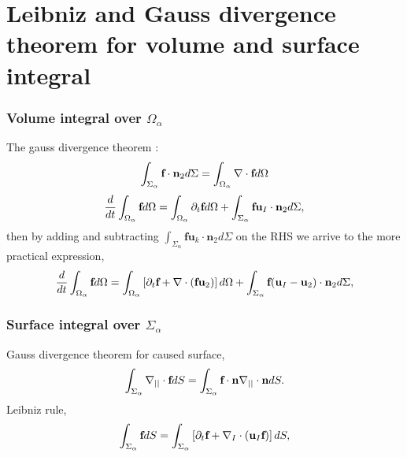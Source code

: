 \section{Leibniz and Gauss divergence theorem for volume and surface integral}
\subsubsection*{Volume integral over $\Omega_\alpha$}
The gauss divergence theorem : 
\begin{equation}
    \int_{\Sigma_\alpha} \textbf{f} \cdot \textbf{n}_2 d\Sigma
    = \int_{\Omega_\alpha} \mathbf{\nabla} \cdot \textbf{f}d\Omega
\end{equation}
\begin{equation}
    \frac{d}{d t} \int_{\Omega_\alpha} \textbf{f} d\Omega
    = \int_{\Omega_\alpha}\partial_t \textbf{f}  d\Omega
    + \int_{\Sigma_\alpha} \textbf{f} \textbf{u}_I \cdot \textbf{n}_2 d\Sigma,
\end{equation}
then by adding and subtracting  $\int_{\Sigma_\alpha} \textbf{f} \textbf{u}_k \cdot \textbf{n}_2 d\Sigma$ on the RHS we arrive to the more practical expression,
\begin{equation}
    \frac{d}{d t} \int_{\Omega_\alpha} \textbf{f} d\Omega
    = \int_{\Omega_\alpha}\left[\partial_t \textbf{f} + \mathbf{\nabla} \cdot\left(\textbf{f}\textbf{u}_2\right) \right]d\Omega\\
    + \int_{\Sigma_\alpha} \textbf{f} (\textbf{u}_I-\textbf{u}_2)\cdot \textbf{n}_2 d\Sigma,
    \label{eq:Reynolds}
\end{equation}


\subsubsection*{Surface integral over $\Sigma_\alpha$}
\label{ap:math}
Gauss divergence theorem for caused surface, 
\begin{equation}
    \int_{\Sigma_\alpha}  \mathbf{\nabla}_{||}  \cdot \textbf{f} dS
    = 
    \int_{\Sigma_\alpha}  \textbf{f} \cdot \textbf{n}\mathbf{\nabla}_{||}\cdot\textbf{n} dS. 
    \label{eq:surf_div_theorem}
\end{equation}
Leibniz rule, 
\begin{equation}
    \int_{\Sigma_\alpha} \textbf{f} dS 
    = \int_{\Sigma_\alpha} \left[
        \partial_t \textbf{f} 
        +   \mathbf{\nabla}_I \cdot (\textbf{u}_I\textbf{f})
    \right]dS,
    \label{eq:Leibnitz}
\end{equation}

